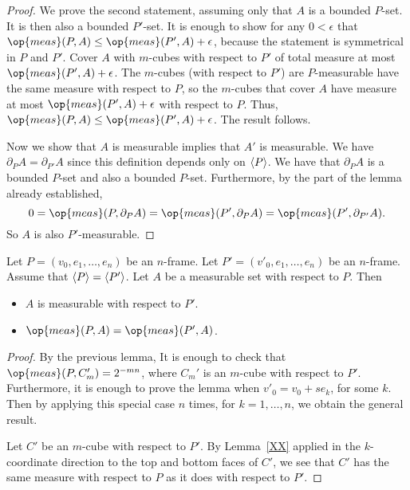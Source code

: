 \begin{proof}
We prove the second statement, assuming only that $A$ is a bounded
$P$-set.  It is then also a bounded $P'$-set.  It is enough to show
for any $0<\epsilon$ that $\op{meas}(P,A)\le
\op{meas}(P',A)+\epsilon$, because the statement is symmetrical in
$P$ and $P'$. Cover $A$ with $m$-cubes with respect to $P'$ of total
measure at most $\op{meas}(P',A) + \epsilon$. The $m$-cubes (with
respect to $P'$) are $P$-measurable have the same measure with
respect to $P$, so the $m$-cubes that cover $A$ have measure at most
$\op{meas}(P',A)+\epsilon$ with respect to $P$. Thus,
$\op{meas}(P,A) \le \op{meas}(P',A) + \epsilon$. The result follows.

Now we show that $A$ is measurable implies that $A'$ is measurable.
We have $\partial_P A = \partial_{P'} A$ since this definition
depends only on ${\langle P\rangle}$.  We have that $\partial_P A$ is a
bounded $P$-set and also a bounded $P$-set.  Furthermore, by the
part of the lemma already established,
 $$0=\op{meas}(P,\partial_P A) =
    \op{meas}(P',\partial_P A) =\op{meas}(P',\partial_{P'} A).$$
So $A$ is also $P'$-measurable.
\end{proof}

\begin{lemma} Let $P = (v_0,e_1,\ldots,e_n)$ be an $n$-frame.
Let $P' = (v'_0,e_1,\ldots,e_n)$ be an $n$-frame.  Assume that
${\langle P\rangle} = {\langle P'\rangle}$.  Let $A$ be a measurable set with respect
to $P$.  Then
    \begin{itemize}
        \item $A$ is measurable with respect to $P'$.
        \item $\op{meas}(P,A) = \op{meas}(P',A)$.
    \end{itemize}
\end{lemma}

\begin{proof} By the previous lemma,
It is enough to check that $\op{meas}(P,C'_m) = 2^{-m n}$, where
$C_m'$ is an $m$-cube with respect to $P'$.  Furthermore, it is
enough to prove the lemma when $v'_0 = v_0 + s e_k$, for some $k$.
Then by applying this special case $n$ times, for $k=1,\ldots,n$, we
obtain the general result.

Let $C'$ be an $m$-cube with respect to $P'$.  By Lemma~\ref{XX}
applied in the $k$-coordinate direction to the top and bottom faces
of $C'$, we see that $C'$ has the same measure with respect to $P$
as it does with respect to $P'$.
\end{proof}

